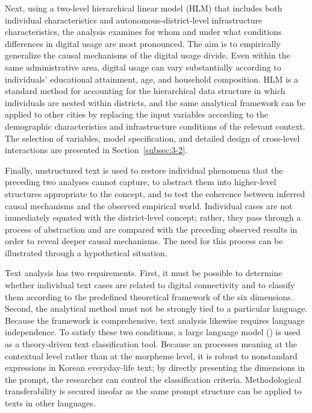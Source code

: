 Next, using a two-level hierarchical linear model (HLM) that includes both individual characteristics and autonomous-district-level \umc{} infrastructure characteristics, the analysis examines for whom and under what conditions differences in digital usage are most pronounced. The aim is to empirically generalize the causal mechanisms of the digital usage divide. Even within the same administrative area, digital usage can vary substantially according to individuals' educational attainment, age, and household composition. HLM is a standard method for accounting for the hierarchical data structure in which individuals are nested within districts, and the same analytical framework can be applied to other cities by replacing the input variables according to the demographic characteristics and infrastructure conditions of the relevant context. The selection of variables, model specification, and detailed design of cross-level interactions are presented in Section~\ref{subsec:3-2}.

Finally, unstructured text is used to restore individual phenomena that the preceding two analyses cannot capture, to abstract them into higher-level structures appropriate to the \umc{} concept, and to test the coherence between inferred causal mechanisms and the observed empirical world. Individual cases are not immediately equated with the district-level \umc{} concept; rather, they pass through a process of abstraction and are compared with the preceding observed results in order to reveal deeper causal mechanisms. The need for this process can be illustrated through a hypothetical situation.

Text analysis has two requirements. First, it must be possible to determine whether individual text cases are related to digital connectivity and to classify them according to the predefined theoretical framework of the six \umc{} dimensions. Second, the analytical method must not be strongly tied to a particular language. Because the \umc{} framework is comprehensive, text analysis likewise requires language independence. To satisfy these two conditions, a large language model (\llm{}) is used as a theory-driven text classification tool. Because an \llm{} processes meaning at the contextual level rather than at the morpheme level, it is robust to nonstandard expressions in Korean everyday-life text; by directly presenting the \umc{} dimensions in the prompt, the researcher can control the classification criteria. Methodological transferability is secured insofar as the same prompt structure can be applied to texts in other languages.

